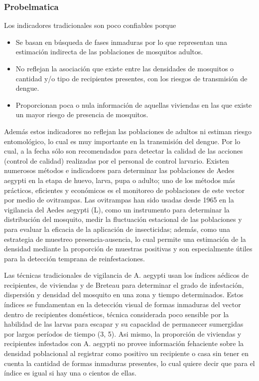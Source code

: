 \subsubsection{Probelmatica}
Los indicadores tradicionales son poco confiables porque
\begin{itemize}
    \item Se basan en búsqueda de fases inmaduras por lo que representan
        una estimación indirecta de las poblaciones de mosquitos adultos.
    \item No reflejan la asociación que existe entre las densidades de
        mosquitos o cantidad y/o tipo de recipientes presentes, con los
        riesgos de transmisión de dengue.
    \item Proporcionan poca o nula información de aquellas viviendas en
        las que existe un mayor riesgo de presencia de mosquitos.
\end{itemize}

Además estos indicadores no reflejan las poblaciones de adultos ni estiman
riesgo entomológico, lo cual es muy importante en la transmisión del dengue.
Por lo cual, a la fecha sólo son recomendados para detectar la calidad de
las acciones (control de calidad) realizadas por el personal de control
larvario. Existen numerosos métodos e indicadores para determinar las
poblaciones de Aedes aegypti en la etapa de huevo, larva, pupa o adulto;
uno de los métodos más prácticos, eficientes y económicos es el monitoreo
de poblaciones de este vector por medio de ovitrampas. Las ovitrampas han
sido usadas desde 1965 en la vigilancia del Aedes aegypti (L), como un
instrumento para determinar la distribución del mosquito, medir la fluctuación
estacional de las poblaciones y para evaluar la eficacia de la aplicación
de insecticidas; además, como una estrategia de muestreo presencia-ausencia,
lo cual permite una estimación de la densidad mediante la proporción de
muestras positivas y son especialmente útiles para la detección temprana
de reinfestaciones. \cite{cenaprece2013}

Las técnicas tradicionales de vigilancia de A. aegypti usan los índices
aédicos de recipientes, de viviendas y de Breteau para determinar el grado
de infestación, dispersión y densidad del mosquito en una zona y tiempo
determinados. Estos índices se fundamentan en la detección visual de formas
inmaduras del vector dentro de recipientes domésticos, técnica considerada
poco sensible por la habilidad de las larvas para escapar y su capacidad de
permanecer sumergidas por largos períodos de tiempo (3, 5). Asi mismo, la
proporción de viviendas y recipientes infestados con A. aegypti no provee
información fehaciente sobre la densidad poblacional al registrar como
positivo un recipiente o casa sin tener en cuenta la cantidad de formas
inmaduras presentes, lo cual quiere decir que para el índice es igual
si hay una o cientos de ellas.
